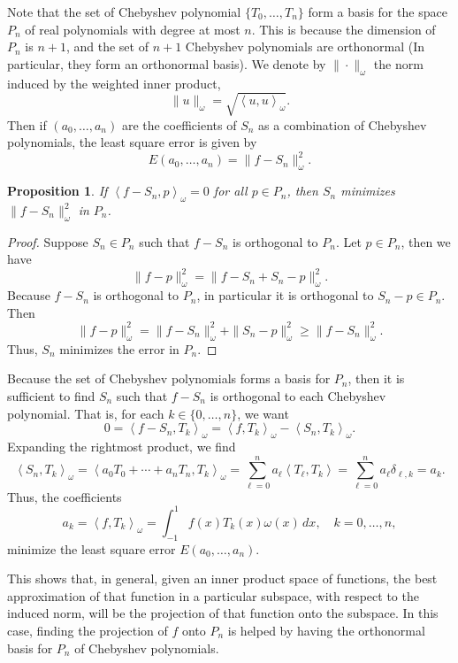 \documentclass[12pt]{article}
\newtheorem{proposition}{Proposition}
\newcommand{\<}{\left\langle}
\renewcommand{\>}{\right\rangle}
\begin{document}
Note that the set of Chebyshev polynomial $\{T_0, \dots, T_n\}$ form a basis for the space $P_n$ of real polynomials with degree at most $n$. This is because the dimension of $P_n$ is $n+1$, and the set of $n+1$ Chebyshev polynomials are orthonormal (In particular, they form an orthonormal basis). We denote by $\|\cdot\|_\omega$ the norm induced by the weighted inner product,
\[
    \|u\|_\omega = \sqrt{\< u, u \>_\omega}.
\]
Then if $(a_0, \dots, a_n)$ are the coefficients of $S_n$ as a combination of Chebyshev polynomials, the least square error is given by
\[
    E(a_0, \dots, a_n) = \| f - S_n \|_\omega^2.
\]

\begin{proposition}
    If $\< f - S_n, p\>_\omega = 0$ for all $p \in P_n$, then $S_n$ minimizes $\| f - S_n \|_\omega^2$ in $P_n$.
\end{proposition}

\begin{proof}
    Suppose $S_n \in P_n$ such that $f - S_n$ is orthogonal to $P_n$. Let $p \in P_n$, then we have
    \[
        \|f - p\|_\omega^2 = \| f - S_n + S_n - p \|_\omega^2.
    \]
    Because $f - S_n$ is orthogonal to $P_n$, in particular it is orthogonal to $S_n - p \in P_n$. Then
    \[
        \|f - p\|_\omega^2 = \| f - S_n \|_\omega^2 + \| S_n - p \|_\omega^2 \geq \| f - S_n \|_\omega^2.
    \]
    Thus, $S_n$ minimizes the error in $P_n$.
    
\end{proof}

Because the set of Chebyshev polynomials forms a basis for $P_n$, then it is sufficient to find $S_n$ such that $f - S_n$ is orthogonal to each Chebyshev polynomial. That is, for each $k \in \{0, \dots, n\}$, we want
\[
    0 = \< f - S_n, T_k\>_\omega = \< f, T_k\>_\omega - \< S_n, T_k\>_\omega.
\]
Expanding the rightmost product, we find
\[
    \< S_n, T_k\>_\omega = \< a_0T_0 + \cdots + a_nT_n, T_k\>_\omega = \sum_{\ell=0}^n a_\ell \< T_\ell, T_k\> = \sum_{\ell=0}^n a_\ell \delta_{\ell, k} = a_k.
\]
Thus, the coefficients
\[
    a_k = \< f, T_k\>_\omega = \int_{-1}^1 f(x) T_k(x) \omega(x) \,dx, \quad k = 0, \dots, n,
\]
minimize the least square error $E(a_0, \dots, a_n)$.

This shows that, in general, given an inner product space of functions, the best approximation of that function in a particular subspace, with respect to the induced norm, will be the projection of that function onto the subspace. In this case, finding the projection of $f$ onto $P_n$ is helped by having the orthonormal basis for $P_n$ of Chebyshev polynomials.
\end{document}
